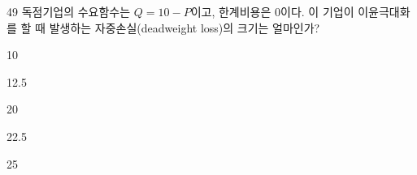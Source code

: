 \begin{question}{49}
독점기업의 수요함수는 $Q=10-P$이고, 한계비용은 0이다. 이 기업이 이윤극대화를 할 때 발생하는 자중손실(deadweight loss)의 크기는 얼마인가?
\begin{choices}
  \item 10
  \item 12.5
  \item 20
  \item 22.5
  \item 25
\end{choices}
\end{question}
